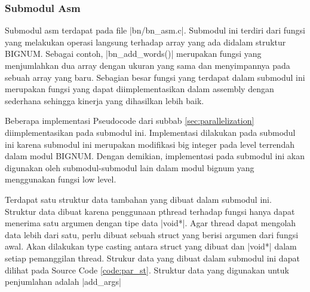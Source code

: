 
\subsubsection{Submodul Asm} \label{sec:bn_asm}
  Submodul asm terdapat pada file |bn/bn_asm.c|. Submodul ini terdiri dari fungsi yang melakukan operasi langsung terhadap array yang ada didalam struktur BIGNUM. Sebagai contoh, |bn_add_words()| merupakan fungsi yang menjumlahkan dua array dengan ukuran yang sama dan menyimpannya pada sebuah array yang baru. Sebagian besar fungsi yang terdapat dalam submodul ini merupakan fungsi yang dapat diimplementasikan dalam assembly dengan sederhana sehingga kinerja yang dihasilkan lebih baik.

  Beberapa implementasi Pseudocode dari subbab \ref{sec:parallelization} diimplementasikan pada submodul ini. Implementasi dilakukan pada submodul ini karena submodul ini merupakan modifikasi big integer pada level terrendah dalam modul BIGNUM. Dengan demikian, implementasi pada submodul ini akan digunakan oleh submodul-submodul lain dalam modul bignum yang menggunakan fungsi low level.

  Terdapat satu struktur data tambahan yang dibuat dalam submodul ini. Struktur data dibuat karena penggunaan pthread terhadap fungsi hanya dapat menerima satu argumen dengan tipe data |void*|. Agar thread dapat mengolah data lebih dari satu, perlu dibuat sebuah struct yang berisi argumen dari fungsi awal. Akan dilakukan type casting antara struct yang dibuat dan |void*| dalam setiap pemanggilan thread. Strukur data yang dibuat dalam submodul ini dapat dilihat pada Source Code \ref{code:par_st}. Struktur data yang digunakan untuk penjumlahan adalah |add_args|

